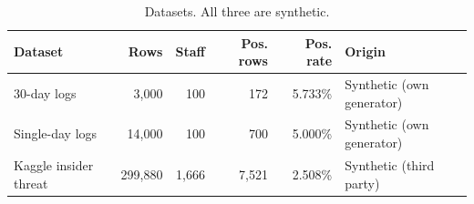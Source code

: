 \begin{table}[H]
\centering
\small
\setlength{\tabcolsep}{3pt}
\begin{tabular}{lrrrrl}
\toprule
Dataset & Rows & Staff & Pos. rows & Pos. rate & Origin \\
\midrule
30-day logs & 3{,}000 & 100 & 172 & 5.733\% & Synthetic (own generator) \\
Single-day logs & 14{,}000 & 100 & 700 & 5.000\% & Synthetic (own generator) \\
Kaggle insider threat & 299{,}880 & 1{,}666 & 7{,}521 & 2.508\% & Synthetic (third party) \\
\bottomrule
\end{tabular}
\caption{Datasets. All three are synthetic.}
\label{tab:datasets}
\end{table}
